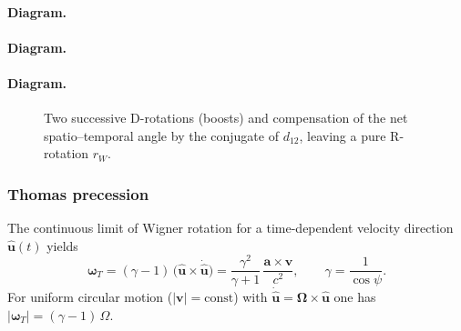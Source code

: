 \documentclass[11pt]{article}
\numberwithin{equation}{section}
\providecommand{\uhat}{\hat{\mathbf u}}
\begin{document}
\paragraph{Diagram.}
\paragraph{Diagram.}
\paragraph{Diagram.}
\begin{figure}[!ht]
\centering
{}
\caption{Two successive D-rotations (boosts) and compensation of the net spatio--temporal angle by the conjugate of $d_{12}$, leaving a pure R-rotation $r_W$.}
\label{fig:tikz-wigner-pullback}
\end{figure}

\subsubsection{Thomas precession}
\label{subsec:thomas}
The continuous limit of Wigner rotation for a time-dependent velocity direction $\uhat(t)$ yields
\begin{equation}
\boldsymbol{\omega}_T=(\gamma-1)\,\bigl(\uhat\times \dot{\uhat}\bigr)
=\frac{\gamma^2}{\gamma+1}\,\frac{\mathbf a\times \mathbf v}{c^2},\qquad
\gamma=\frac{1}{\cos\psi}.
\end{equation}
For uniform circular motion ($|\mathbf v|=\mathrm{const}$) with $\dot{\uhat}=\boldsymbol{\Omega}\times\uhat$ one has
$\lvert\boldsymbol{\omega}_T\rvert=(\gamma-1)\,\Omega$.
\end{document}
